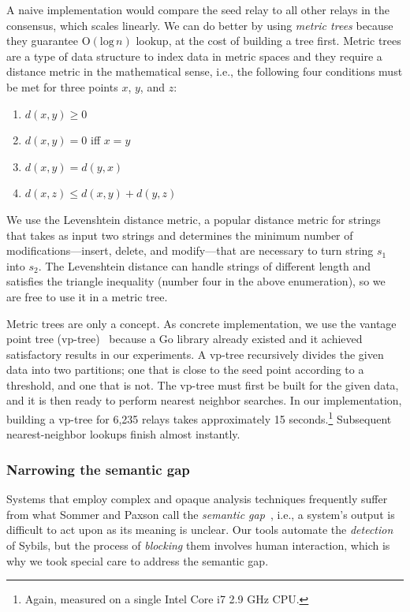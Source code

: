 A naive implementation would compare the seed relay to all other relays in the
consensus, which scales linearly.  We can do better by using \emph{metric trees}
because they guarantee $\mathrm{O}(\textrm{log}\,n)$ lookup, at the cost of
building a tree first.  Metric trees are a type of data structure to index data
in metric spaces and they require a distance metric in the mathematical sense,
i.e., the following four conditions must be met for three points $x$, $y$, and
$z$:
\begin{enumerate}
	\item $d(x, y) \geq 0$
	\item $d(x, y) = 0$ iff $x = y$
	\item $d(x, y) = d(y, x)$
	\item $d(x, z) \leq d(x, y) + d(y, z)$
\end{enumerate}

We use the Levenshtein distance metric, a popular distance metric for strings
that takes as input two strings and determines the minimum number of
modifications---insert, delete, and modify---that are necessary to turn string
$s_{1}$ into $s_{2}$.  The Levenshtein distance can handle strings of different
length and satisfies the triangle inequality (number four in the above
enumeration), so we are free to use it in a metric tree.

Metric trees are only a concept.  As concrete implementation, we use the vantage
point tree (vp-tree)~\cite{Yianilos1993a} because a Go library already existed
and it achieved satisfactory results in our experiments.  A vp-tree recursively
divides the given data into two partitions; one that is close to the seed point
according to a threshold, and one that is not.  The vp-tree must first be built
for the given data, and it is then ready to perform nearest neighbor searches.
In our implementation, building a vp-tree for 6,235 relays takes approximately
15 seconds.\footnote{Again, measured on a single Intel Core i7 2.9 GHz CPU.}
Subsequent nearest-neighbor lookups finish almost instantly.


\subsubsection{Narrowing the semantic gap}
Systems that employ complex and opaque analysis techniques frequently suffer
from what Sommer and Paxson call the \emph{semantic gap}~\cite[\S
III.C]{Sommer2010a}, i.e., a system's output is difficult to act upon as its
meaning is unclear.  Our tools automate the \emph{detection} of Sybils, but the
process of \emph{blocking} them involves human interaction, which is why we took
special care to address the semantic gap.

